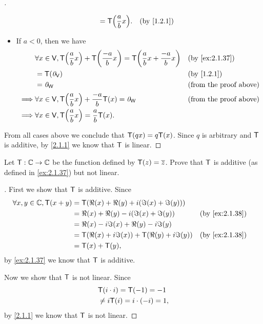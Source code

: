 \begin{proof}[]
\begin{itemize}
\begin{align*}
                                                & = \T\pa{\frac{a}{b} x}.               &  & \text{(by \cref{1.2.1})}
          \end{align*}
    \item If \(a < 0\), then we have
          \begin{align*}
                     & \forall x \in \V, \T\pa{\frac{a}{b} x} + \T\pa{\frac{-a}{b} x} = \T\pa{\frac{a}{b} x + \frac{-a}{b} x} &  & \text{(by \cref{ex:2.1.37})}  \\
                     & = \T(\zv_{\V})                                                                                         &  & \text{(by \cref{1.2.1})}      \\
                     & = \zv_{\W}                                                                                             &  & \text{(from the proof above)} \\
            \implies & \forall x \in \V, \T\pa{\frac{a}{b} x} + \frac{-a}{b} \T(x) = \zv_{\W}                                 &  & \text{(from the proof above)} \\
            \implies & \forall x \in \V, \T\pa{\frac{a}{b} x} = \frac{a}{b} \T(x).
          \end{align*}
  \end{itemize}
  From all cases above we conclude that \(\mathsf{T}(qx) = q \mathsf{T}(x)\).
  Since \(q\) is arbitrary and \(\mathsf{T}\) is additive, by \cref{2.1.1} we know that \(\mathsf{T}\) is linear.
\end{proof}

\begin{ex}\label{ex:2.1.38}
  Let \(\mathsf{T} : \mathbb{C} \to \mathbb{C}\) be the function defined by \(\mathsf{T}(z) = \overline{z}\).
  Prove that \(\mathsf{T}\) is additive (as defined in \cref{ex:2.1.37}) but not linear.
\end{ex}

\begin{proof}[]
  First we show that \(\mathsf{T}\) is additive.
  Since
  \begin{align*}
    \forall x, y \in \C, \T(x + y) & = \T(\Re(x) + \Re(y) + i (\Im(x) + \Im(y)))                                       \\
                                   & = \Re(x) + \Re(y) - i (\Im(x) + \Im(y))         &  & \text{(by \cref{ex:2.1.38})} \\
                                   & = \Re(x) - i \Im(x) + \Re(y) - i \Im(y)                                           \\
                                   & = \T(\Re(x) + i \Im(x)) + \T(\Re(y) + i \Im(y)) &  & \text{(by \cref{ex:2.1.38})} \\
                                   & = \T(x) + \T(y),
  \end{align*}
  by \cref{ex:2.1.37} we know that \(\mathsf{T}\) is additive.

  Now we show that \(\mathsf{T}\) is not linear.
  Since
  \begin{align*}
     & \mathsf{T}(i \cdot i) = \mathsf{T}(-1) = -1      \\
     & \neq i \mathsf{T}(i) = i \cdot (-i) = 1,
  \end{align*}
  by \cref{2.1.1} we know that \(\mathsf{T}\) is not linear.
\end{proof}
